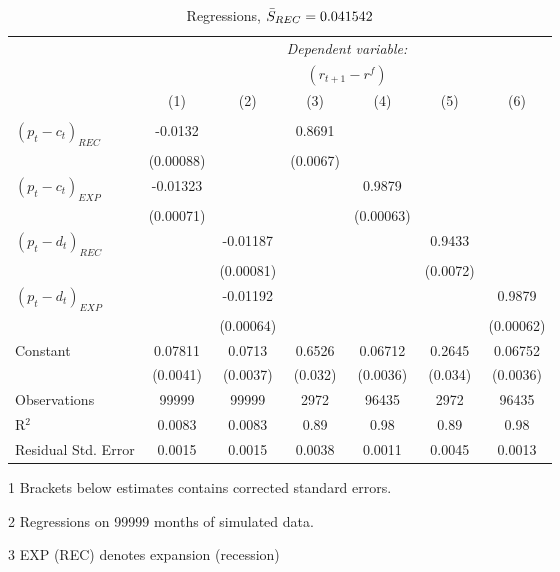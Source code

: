 \begin{table}[H]
\centering   
  \caption{Regressions, $\Bar{S}_{REC} = 0.041542$}           
  \label{tab:regress1}     
  \begin{threeparttable}
\begin{tabular}{@{\hspace{5pt}}l@{\hspace{5pt}}cccccc} 
\toprule 
 & \multicolumn{6}{c}{\textit{Dependent variable:}} \\ 
 & \multicolumn{6}{c}{$\left(r_{t+1}-r^f\right)$} \\ 
 \cmidrule(rr){2-7}
 & (1) & (2) & (3) & (4) & (5) & (6) \\ 
\midrule  
\\[-2.1ex] $\left( p_t - c_t \right)_{REC}$ &-0.0132& &0.8691 & & &\\ 
  & (0.00088) & &(0.0067) & & & \\ 
 \addlinespace 
  $\left( p_t - c_t \right)_{EXP}$ &-0.01323  &    & &0.9879 & &  \\ 
  & (0.00071) & & &(0.00063) & & \\ 
 \addlinespace 
  $\left( p_t - d_t \right)_{REC}$ & &-0.01187& & & 0.9433  &   \\ 
                                   & &  (0.00081) & & & (0.0072) &    \\ 
 \addlinespace 
  $\left( p_t - d_t \right)_{EXP}$ & &   -0.01192& & & &0.9879 \\ 
                                   & &  (0.00064) & & & &(0.00062) \\ 
 \addlinespace 
 Constant &0.07811 &0.0713&0.6526 &0.06712 &0.2645 &0.06752 \\ 
          &(0.0041) &(0.0037)&(0.032)&(0.0036)&(0.034)&(0.0036) \\ 
 \addlinespace 
\midrule  
Observations & 99999 & 99999&2972 & 96435&2972&96435\\
R$^{2}$ &0.0083 & 0.0083&0.89&0.98&0.89&0.98 \\ 
Residual Std. Error &0.0015 & 0.0015&0.0038&0.0011&0.0045&0.0013 \\ 
\bottomrule 
\end{tabular} 
\begin{tablenotes}
\footnotesize{
\item[1] Brackets below estimates contains \citet{NW87} corrected standard errors. 
\item[2] Regressions on 99999 months of simulated data.
\item[3] EXP (REC) denotes expansion (recession)
}
\end{tablenotes}
\end{threeparttable}
\end{table} 
